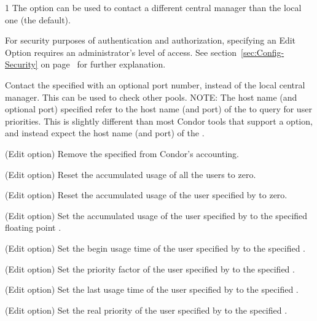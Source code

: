\begin{ManPage}{\label{man-condor-userprio}}{1}
The  option can be used to contact a different central manager 
than the local one (the default).


For security purposes  of authentication and authorization,
specifying an Edit Option requires an administrator's level of access.
See section~\ref{sec:Config-Security} on page~\pageref{sec:Config-Security}
for further explanation.

\begin{Options}

  {Contact the specified  with an
  optional port number, instead of the local central manager. 
  This can be used to check other pools.  
  NOTE: The host name (and optional port) specified refer to the host name
  (and port) of the  to query for user priorities.
  This is slightly different than most Condor tools
  that support a  option,
  and instead expect the host name (and port) of the .}

  {(Edit option) Remove the specified  from Condor's accounting.}

  {(Edit option) Reset the accumulated usage of all the users to zero.}

  {(Edit option) Reset the accumulated usage of the user specified by
   to zero. }

  {(Edit option) Set the accumulated usage of the user specified by
   to the specified floating point . }

  {(Edit option) Set the begin usage time of the user specified by
   to the specified . }

  {(Edit option) Set the priority factor of the user specified by
   to the specified .  }

  {(Edit option) Set the last usage time of the user specified by
   to the specified .  }

  {(Edit option) Set the real priority of the user specified by
   to the specified .  }


\end{Options}
\end{ManPage}
